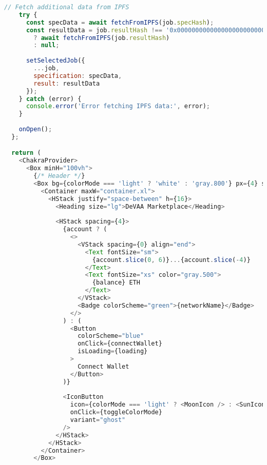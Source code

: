 \begin{lstlisting}[language=JavaScript,caption={App.jsx - Main React Application}]
    // Fetch additional data from IPFS
    try {
      const specData = await fetchFromIPFS(job.specHash);
      const resultData = job.resultHash !== '0x0000000000000000000000000000000000000000000000000000000000000000' 
        ? await fetchFromIPFS(job.resultHash) 
        : null;
        
      setSelectedJob({
        ...job,
        specification: specData,
        result: resultData
      });
    } catch (error) {
      console.error('Error fetching IPFS data:', error);
    }
    
    onOpen();
  };

  return (
    <ChakraProvider>
      <Box minH="100vh">
        {/* Header */}
        <Box bg={colorMode === 'light' ? 'white' : 'gray.800'} px={4} shadow="md">
          <Container maxW="container.xl">
            <HStack justify="space-between" h={16}>
              <Heading size="lg">DeVAA Marketplace</Heading>
              
              <HStack spacing={4}>
                {account ? (
                  <>
                    <VStack spacing={0} align="end">
                      <Text fontSize="sm">
                        {account.slice(0, 6)}...{account.slice(-4)}
                      </Text>
                      <Text fontSize="xs" color="gray.500">
                        {balance} ETH
                      </Text>
                    </VStack>
                    <Badge colorScheme="green">{networkName}</Badge>
                  </>
                ) : (
                  <Button
                    colorScheme="blue"
                    onClick={connectWallet}
                    isLoading={loading}
                  >
                    Connect Wallet
                  </Button>
                )}
                
                <IconButton
                  icon={colorMode === 'light' ? <MoonIcon /> : <SunIcon />}
                  onClick={toggleColorMode}
                  variant="ghost"
                />
              </HStack>
            </HStack>
          </Container>
        </Box>


\end{lstlisting}
